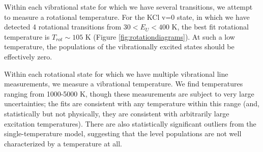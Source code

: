 \documentclass[twocolumn]{aastex62}
\begin{document}



Within each vibrational state for which we have several transitions, we attempt
to measure a rotational temperature.  For the KCl v=0 state, in which we have
detected 4 rotational transitions from $30 < E_U < 400$ K, the best fit
rotational temperature is $T_{rot}\sim105$ K (Figure
\ref{fig:rotationdiagrams}).  At such a low temperature, the populations of the
vibrationally excited states should be effectively zero.  

Within each rotational state for which we have multiple vibrational line
measurements, we measure a vibrational temperature.  We find temperatures
ranging from 1000-5000 K, though these measurements are subject to very large
uncertainties; the fits are consistent with any temperature within this range
(and, statistically but not physically, they are consistent with arbitrarily
large excitation temperatures).  There are also statistically significant
outliers from the single-temperature model, suggesting that the level
populations are not well characterized by a temperature at all.

\end{document}
